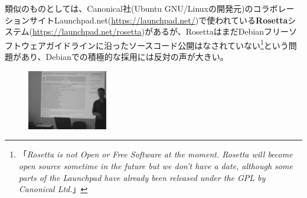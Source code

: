 \documentclass[mingoth,a4paper]{jsarticle}
\begin{document}

類似のものとしては、Canonical社(Ubuntu GNU/Linuxの開発元)のコラボレーションサイトLaunchpad.net(\url{https://launchpad.net/})で使われている\textbf{Rosetta}システム(\url{https://launchpad.net/rosetta})があるが、RosettaはまだDebianフリーソフトウェアガイドラインに沿ったソースコード公開はなされていない\footnote{「\emph{Rosetta is not Open or Free Software at the moment. Rosetta will become open source sometime in the future but we don't have a date, although some parts of the Launchpad have already been released under the GPL by Canonical Ltd.}」}という問題があり、Debianでの積極的な採用には反対の声が大きい。


\begin{figure}\includegraphics[width=3.5cm]{image200610/pootle.eps}\end{figure}
\end{document}
